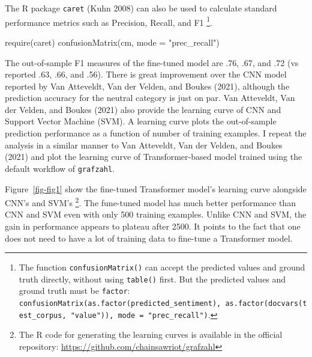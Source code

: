 \documentclass[
]{ccr}
\newenvironment{Shaded}{\begin{snugshade}}{\end{snugshade}}
\newcommand{\AttributeTok}[1]{\textcolor[rgb]{0.40,0.45,0.13}{#1}}
\newcommand{\FunctionTok}[1]{\textcolor[rgb]{0.28,0.35,0.67}{#1}}
\newcommand{\NormalTok}[1]{\textcolor[rgb]{0.00,0.23,0.31}{#1}}
\newcommand{\StringTok}[1]{\textcolor[rgb]{0.13,0.47,0.30}{#1}}
\begin{document}
The R package \texttt{caret} (Kuhn 2008) can also be used to calculate
standard performance metrics such as Precision, Recall, and F1
\footnote{The function \texttt{confusionMatrix()} can accept the
  predicted values and ground truth directly, without using
  \texttt{table()} first. But the predicted values and ground truth must
  be \texttt{factor}:
  \texttt{confusionMatrix(as.factor(predicted\_sentiment),\ as.factor(docvars(test\_corpus,\ "value")),\ mode\ =\ "prec\_recall")}.}.

\begin{Shaded}
\begin{Highlighting}[]
\FunctionTok{require}\NormalTok{(caret)}
\FunctionTok{confusionMatrix}\NormalTok{(cm, }\AttributeTok{mode =} \StringTok{"prec\_recall"}\NormalTok{)}
\end{Highlighting}
\end{Shaded}

The out-of-sample F1 measures of the fine-tuned model are .76, .67, and
.72 (vs reported .63, .66, and .56). There is great improvement over the
CNN model reported by Van Atteveldt, Van der Velden, and Boukes (2021),
although the prediction accuracy for the neutral category is just on
par. Van Atteveldt, Van der Velden, and Boukes (2021) also provide the
learning curve of CNN and Support Vector Machine (SVM). A learning curve
plots the out-of-sample prediction performance as a function of number
of training examples. I repeat the analysis in a similar manner to Van
Atteveldt, Van der Velden, and Boukes (2021) and plot the learning curve
of Transformer-based model trained using the default workflow of
\texttt{grafzahl}.

Figure~\ref{fig-fig1} show the fine-tuned Transformer model's learning
curve alongside CNN's and SVM's \footnote{The R code for generating the
  learning curves is available in the official repository:
  \url{https://github.com/chainsawriot/grafzahl}}. The fune-tuned model
has much better performance than CNN and SVM even with only 500 training
examples. Unlike CNN and SVM, the gain in performance appears to plateau
after 2500. It points to the fact that one does not need to have a lot
of training data to fine-tune a Transformer model.
\end{document}
